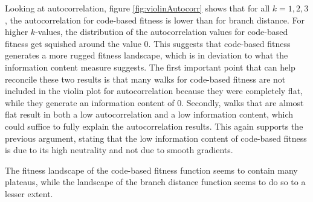 Looking at autocorrelation, figure \ref{fig:violinAutocorr} shows that for all $k=1, 2, 3$, the autocorrelation for code-based fitness is lower than for branch distance.
For higher $k$-values, the distribution of the autocorrelation values for code-based fitness get squished around the value $0$.
This suggests that code-based fitness generates a more rugged fitness landscape, which is in deviation to what the information content measure suggests.
The first important point that can help reconcile these two results is that many walks for code-based fitness are not included in the violin plot for autocorrelation because they were completely flat, while they generate an information content of $0$.
Secondly, walks that are almost flat result in both a low autocorrelation and a low information content, which could suffice to fully explain the autocorrelation results.
This again supports the previous argument, stating that the low information content of code-based fitness is due to its high neutrality and not due to smooth gradients.

\begin{mdframed}[style=box, frametitle={Summary RQ1:}]
	The fitness landscape of the code-based fitness function seems to contain many plateaus, while the landscape of the branch distance function seems to do so to a lesser extent. 
\end{mdframed}
